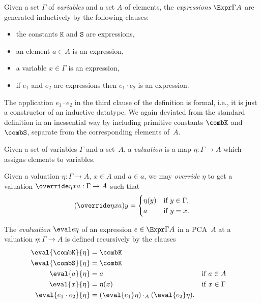 \begin{definition}
  \label{def:expression}
  \leanok
  Given a set $\Gamma$ of \emph{variables} and a set $A$ of elements, the
  \emph{expressions} $\Expr \Gamma A$ are generated inductively by the following clauses:
  \begin{itemize}
    \item the constants $\mathtt{K}$ and $\mathtt{S}$ are expressions,
    \item an element $a \in A$ is an expression,
    \item a variable $x \in \Gamma$ is an expression,
    \item if $e_1$ and $e_2$ are expressions then $e_1 \cdot e_2$ is an expression.
  \end{itemize}
\end{definition}

\noindent
The application $e_1 \cdot e_2$ in the third clause of the definition is formal, i.e., it is just a constructor of an inductive datatype. We again deviated from the standard definition in an inessential way by including primitive constants $\combK$ and $\combS$, separate from the corresponding elements of~$A$.

Given a set of variables $\Gamma$ and a set~$A$, a \emph{valuation} is a map $\eta : \Gamma \to A$ which assigns elements to variables.

\begin{definition}
  \label{def:override}%
  \leanok
  Given a valuation $\eta : \Gamma \to A$, $x \in A$ and $a \in a$, we may \emph{override} $\eta$
  to get a valuation $\override \eta x a : \Gamma \to A$ such that
  \begin{equation*}
    (\override \eta x a) y =
    \begin{cases}
      \eta(y) &\text{if $y \in \Gamma$,}\\
      a       &\text{if $y = x$.}
    \end{cases}
  \end{equation*}
\end{definition}

\begin{definition}
  \label{def:evaluation}
  \leanok
  The \emph{evaluation} $\eval e \eta$ of an expression $e \in \Expr \Gamma A$ in a PCA~$A$ at a
  valuation $\eta : \Gamma \to A$ is defined recursively by the clauses
  \begin{align*}
    \eval{\combK}{\eta} &= \combK \\
    \eval{\combS}{\eta} &= \combK \\
    \eval{a}{\eta} &= a  &&\text{if $a \in A$}\\
    \eval{x}{\eta} &= \eta(x)  &&\text{if $x \in \Gamma$}\\
    \eval{e_1 \cdot e_2}{\eta} &= (\eval{e_1} \eta) \cdot_A (\eval{e_2} \eta).
  \end{align*}
\end{definition}

